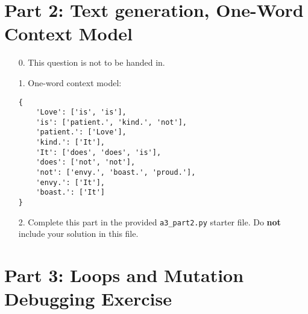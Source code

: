 \documentclass[fontsize=11pt]{article}
\begin{document}
\newpage

\section*{Part 2: Text generation, One-Word Context Model}

\begin{enumerate}

\item[0.]
This question is not to be handed in.

\item[1.]
One-word context model:

\begin{verbatim}
{
    'Love': ['is', 'is'],
    'is': ['patient.', 'kind.', 'not'],
    'patient.': ['Love'],
    'kind.': ['It'],
    'It': ['does', 'does', 'is'],
    'does': ['not', 'not'],
    'not': ['envy.', 'boast.', 'proud.'],
    'envy.': ['It'],
    'boast.': ['It']
}
\end{verbatim}

\item[2.]
Complete this part in the provided \texttt{a3\_part2.py} starter file.
Do \textbf{not} include your solution in this file.

\end{enumerate}

\newpage

\section*{Part 3: Loops and Mutation Debugging Exercise}
\end{document}
